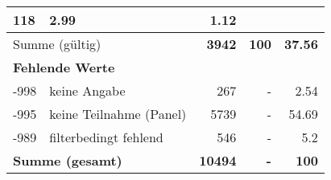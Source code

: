\begin{longtable}{lXrrr}
       \num{118} &
       \num[round-mode=places,round-precision=2]{2,99} &
         \num[round-mode=places,round-precision=2]{1,12} \\
     \midrule
     \multicolumn{2}{l}{Summe (gültig)} &
       \textbf{\num{3942}} &
     \textbf{100} &
       \textbf{\num[round-mode=places,round-precision=2]{37,56}} \\
     \multicolumn{5}{l}{\textbf{Fehlende Werte}}\\
       -998 &
       keine Angabe &
         \num{267} &
        - &
         \num[round-mode=places,round-precision=2]{2,54} \\
       -995 &
       keine Teilnahme (Panel) &
         \num{5739} &
        - &
         \num[round-mode=places,round-precision=2]{54,69} \\
       -989 &
       filterbedingt fehlend &
         \num{546} &
        - &
         \num[round-mode=places,round-precision=2]{5,2} \\
     \midrule
     \multicolumn{2}{l}{\textbf{Summe (gesamt)}} &
          \textbf{\num{10494}} &
        \textbf{-} &
        \textbf{100} \\
     \bottomrule
     \end{longtable}
     
